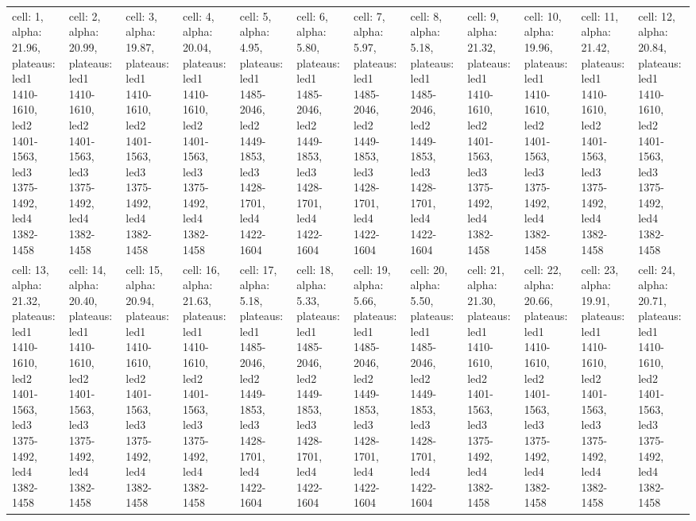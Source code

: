 \documentclass{article}
\begin{document}
\begin{landscape}
\begin{longtable}{|p{1.5cm}|p{1.5cm}|p{1.5cm}|p{1.5cm}|p{1.5cm}|p{1.5cm}|p{1.5cm}|p{1.5cm}|p{1.5cm}|p{1.5cm}|p{1.5cm}|p{1.5cm}|}
\hline \hline
\endlastfoot
\rowcolor{lightgray} cell: 1, alpha: 21.96, plateaus: led1 1410-1610, led2 1401-1563, led3 1375-1492, led4 1382-1458 &cell: 2, alpha: 20.99, plateaus: led1 1410-1610, led2 1401-1563, led3 1375-1492, led4 1382-1458 &cell: 3, alpha: 19.87, plateaus: led1 1410-1610, led2 1401-1563, led3 1375-1492, led4 1382-1458 &cell: 4, alpha: 20.04, plateaus: led1 1410-1610, led2 1401-1563, led3 1375-1492, led4 1382-1458 &cell: 5, alpha: 4.95, plateaus: led1 1485-2046, led2 1449-1853, led3 1428-1701, led4 1422-1604 &cell: 6, alpha: 5.80, plateaus: led1 1485-2046, led2 1449-1853, led3 1428-1701, led4 1422-1604 &cell: 7, alpha: 5.97, plateaus: led1 1485-2046, led2 1449-1853, led3 1428-1701, led4 1422-1604 &cell: 8, alpha: 5.18, plateaus: led1 1485-2046, led2 1449-1853, led3 1428-1701, led4 1422-1604 &cell: 9, alpha: 21.32, plateaus: led1 1410-1610, led2 1401-1563, led3 1375-1492, led4 1382-1458 &cell: 10, alpha: 19.96, plateaus: led1 1410-1610, led2 1401-1563, led3 1375-1492, led4 1382-1458 &cell: 11, alpha: 21.42, plateaus: led1 1410-1610, led2 1401-1563, led3 1375-1492, led4 1382-1458 &cell: 12, alpha: 20.84, plateaus: led1 1410-1610, led2 1401-1563, led3 1375-1492, led4 1382-1458 \\
cell: 13, alpha: 21.32, plateaus: led1 1410-1610, led2 1401-1563, led3 1375-1492, led4 1382-1458 &cell: 14, alpha: 20.40, plateaus: led1 1410-1610, led2 1401-1563, led3 1375-1492, led4 1382-1458 &cell: 15, alpha: 20.94, plateaus: led1 1410-1610, led2 1401-1563, led3 1375-1492, led4 1382-1458 &cell: 16, alpha: 21.63, plateaus: led1 1410-1610, led2 1401-1563, led3 1375-1492, led4 1382-1458 &cell: 17, alpha: 5.18, plateaus: led1 1485-2046, led2 1449-1853, led3 1428-1701, led4 1422-1604 &cell: 18, alpha: 5.33, plateaus: led1 1485-2046, led2 1449-1853, led3 1428-1701, led4 1422-1604 &cell: 19, alpha: 5.66, plateaus: led1 1485-2046, led2 1449-1853, led3 1428-1701, led4 1422-1604 &cell: 20, alpha: 5.50, plateaus: led1 1485-2046, led2 1449-1853, led3 1428-1701, led4 1422-1604 &cell: 21, alpha: 21.30, plateaus: led1 1410-1610, led2 1401-1563, led3 1375-1492, led4 1382-1458 &cell: 22, alpha: 20.66, plateaus: led1 1410-1610, led2 1401-1563, led3 1375-1492, led4 1382-1458 &cell: 23, alpha: 19.91, plateaus: led1 1410-1610, led2 1401-1563, led3 1375-1492, led4 1382-1458 &cell: 24, alpha: 20.71, plateaus: led1 1410-1610, led2 1401-1563, led3 1375-1492, led4 1382-1458 \\

\end{longtable}
\end{landscape}
\end{document}
